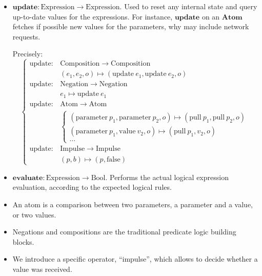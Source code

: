 \documentclass[applsci,article,submit,moreauthors,pdftex,10pt,a4paper]{mdpi}
\begin{document}
\begin{itemize}
    \item $\mathbf{update}: \mathrm{Expression} \rightarrow \mathrm{Expression}$. Used to reset any internal state and query up-to-date values for the expressions. For instance, $\mathbf{update}$ on an $\mathbf{Atom}$ fetches if possible new values for the parameters, why may include network requests.
    
    Precisely:
    \[
    \begin{cases}
    \mathrm{update} : & \mathrm{Composition} \rightarrow \mathrm{Composition} \\ 
    & (e_1, e_2, o) \mapsto (\mathrm{update}~e_1, \mathrm{update}~e_2, o) \\
    \mathrm{update} : & \mathrm{Negation} \rightarrow \mathrm{Negation} \\
    &  e_1 \mapsto \mathrm{update}~ e_1 \\
    \mathrm{update} :&  \mathrm{Atom} \rightarrow \mathrm{Atom} \\
    & \begin{cases}
    (\mathrm{parameter}~p_1, \mathrm{parameter}~p_2, o) \mapsto (\mathrm{pull}~p_1, \mathrm{pull}~p_2, o) \\
    (\mathrm{parameter}~p_1, \mathrm{value}~v_2, o) \mapsto (\mathrm{pull}~p_1, v_2, o) \\ 
    \dots
    \end{cases}\\
    \mathrm{update} : & \mathrm{Impulse} \rightarrow \mathrm{Impulse} \\
    & (p, b) \mapsto (p, \mathrm{false})
    \end{cases}
    \] 
        
    \item $\mathbf{evaluate}: \mathrm{Expression} \rightarrow \mathrm{Bool}$. Performs the actual logical expression evaluation, according to the expected logical rules.
\end{itemize}

\begin{itemize}
    \item An atom is a comparison between two parameters, a parameter and a value, or two values.
    \item Negations and compositions are the traditional predicate logic building blocks.
    \item We introduce a specific operator, ``impulse'', which allows to decide whether a value was received.
\end{itemize}
\end{document}
